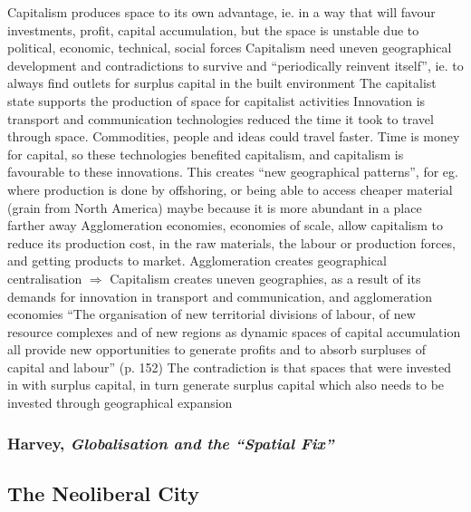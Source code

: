 \documentclass{article}
\begin{document}
\begin{outline}
	\1 Capitalism produces space to its own advantage, ie. in a way that will favour investments, profit, capital accumulation, but the space is unstable due to political, economic, technical, social forces
	\1 Capitalism need uneven geographical development and contradictions to survive and ``periodically reinvent itself'', ie. to always find outlets for surplus capital in the built environment
	\1 The capitalist state supports the production of space for capitalist activities 
	\1 Innovation is transport and communication technologies reduced the time it took to travel through space. Commodities, people and ideas could travel faster. Time is money for capital, so these technologies benefited capitalism, and capitalism is favourable to these innovations. This creates ``new geographical patterns'', for eg. where production is done by offshoring, or being able to access cheaper material (grain from North America) maybe because it is more abundant in a place farther away
	\1 Agglomeration economies, economies of scale, allow capitalism to reduce its production cost, in the raw materials, the labour or production forces, and getting products to market. Agglomeration creates geographical centralisation
	\1 $\Rightarrow$ Capitalism creates uneven geographies, as a result of its demands for innovation in transport and communication, and agglomeration economies
	\1 ``The organisation of new territorial divisions of labour, of new resource complexes and of new regions as dynamic spaces of capital accumulation all provide new opportunities to generate profits and to absorb surpluses of capital and labour'' (p. 152)
	\1 The contradiction is that spaces that were invested in with surplus capital, in turn generate surplus capital which also needs to be invested through geographical expansion
\end{outline}


\subsubsection{Harvey, \textit{Globalisation and the ``Spatial Fix''}}

\begin{outline}
	\1
\end{outline}


\subsection{The Neoliberal City}
\end{document}
